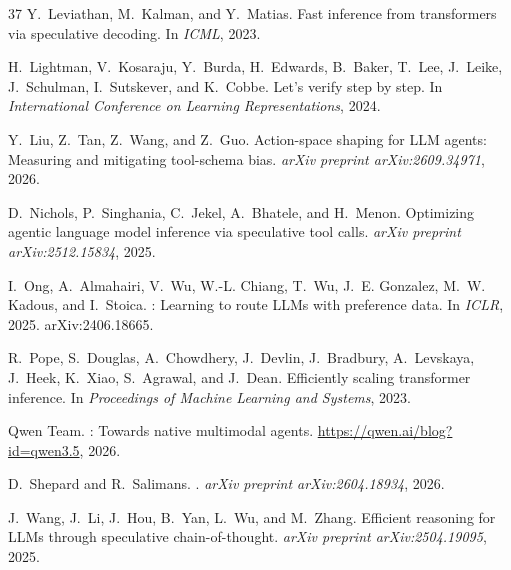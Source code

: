 \documentclass[11pt, copyright, logo, secondlogo]{template/lark}
\begin{document}
\begin{thebibliography}{37}
Y.~Leviathan, M.~Kalman, and Y.~Matias.
\newblock Fast inference from transformers via speculative decoding.
\newblock In \emph{ICML}, 2023.

H.~Lightman, V.~Kosaraju, Y.~Burda, H.~Edwards, B.~Baker, T.~Lee, J.~Leike,
  J.~Schulman, I.~Sutskever, and K.~Cobbe.
\newblock Let's verify step by step.
\newblock In \emph{International Conference on Learning Representations}, 2024.

Y.~Liu, Z.~Tan, Z.~Wang, and Z.~Guo.
\newblock Action-space shaping for {LLM} agents: Measuring and mitigating
  tool-schema bias.
\newblock \emph{arXiv preprint arXiv:2609.34971}, 2026.

D.~Nichols, P.~Singhania, C.~Jekel, A.~Bhatele, and H.~Menon.
\newblock Optimizing agentic language model inference via speculative tool
  calls.
\newblock \emph{arXiv preprint arXiv:2512.15834}, 2025.

I.~Ong, A.~Almahairi, V.~Wu, W.-L. Chiang, T.~Wu, J.~E. Gonzalez, M.~W. Kadous,
  and I.~Stoica.
: Learning to route {LLMs} with preference data.
\newblock In \emph{ICLR}, 2025.
\newblock arXiv:2406.18665.

R.~Pope, S.~Douglas, A.~Chowdhery, J.~Devlin, J.~Bradbury, A.~Levskaya,
  J.~Heek, K.~Xiao, S.~Agrawal, and J.~Dean.
\newblock Efficiently scaling transformer inference.
\newblock In \emph{Proceedings of Machine Learning and Systems}, 2023.

{Qwen Team}.
: Towards native multimodal agents.
\newblock \url{https://qwen.ai/blog?id=qwen3.5}, 2026.

D.~Shepard and R.~Salimans.
.
\newblock \emph{arXiv preprint arXiv:2604.18934}, 2026.

J.~Wang, J.~Li, J.~Hou, B.~Yan, L.~Wu, and M.~Zhang.
\newblock Efficient reasoning for {LLM}s through speculative chain-of-thought.
\newblock \emph{arXiv preprint arXiv:2504.19095}, 2025{}.


\end{thebibliography}
\end{document}
